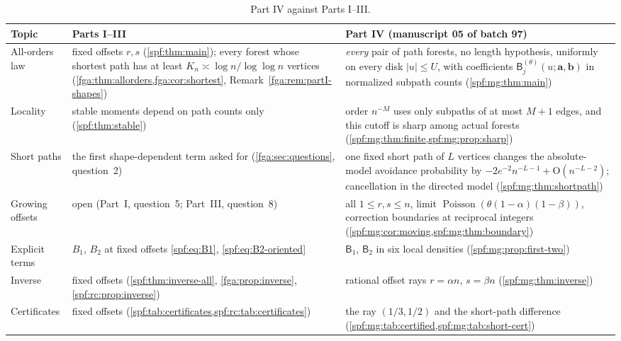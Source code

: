 \documentclass[11pt]{article}
\numberwithin{equation}{section}
\theoremstyle{definition}
\theoremstyle{remark}
\theoremstyle{definition}
\newcommand{\bigO}{\mathrm O}
\newcommand{\mga}{\boldsymbol a}
\newcommand{\mgb}{\boldsymbol b}
\begin{document}
\begin{table}[htbp]
\centering\small
\renewcommand{\arraystretch}{1.15}
\begin{tabular}{@{}>{\raggedright\arraybackslash}p{}>{\raggedright\arraybackslash}p{}>{\raggedright\arraybackslash}p{}@{}}
\toprule
Topic & Parts I--III & Part IV (manuscript 05 of batch 97)\\
\midrule
All-orders law &
fixed offsets $r,s$ (\cref{spf:thm:main}); every forest whose shortest path
has at least $K_n\asymp\log n/\log\log n$ vertices
(\cref{fga:thm:allorders,fga:cor:shortest}, Remark~\ref{fga:rem:partI-shapes}) &
\emph{every} pair of path forests, no length hypothesis, uniformly on every
disk $|u|\le U$, with coefficients $\mathsf B_j^{(\theta)}(u;\mga,\mgb)$ in
normalized subpath counts (\cref{spf:mg:thm:main})\\
Locality &
stable moments depend on path counts only (\cref{spf:thm:stable}) &
order $n^{-M}$ uses only subpaths of at most $M+1$ edges, and this cutoff is
sharp among actual forests (\cref{spf:mg:thm:finite,spf:mg:prop:sharp})\\
Short paths &
the first shape-dependent term asked for (\cref{fga:sec:questions},
question~2) &
one fixed short path of $L$ vertices changes the absolute-model avoidance
probability by $-2e^{-2}n^{-L-1}+\bigO(n^{-L-2})$; cancellation in the directed
model (\cref{spf:mg:thm:shortpath})\\
Growing offsets &
open (Part~I, question~5; Part~III, question~8) &
all $1\le r,s\le n$, limit $\operatorname{Poisson}(\theta(1-\alpha)(1-\beta))$,
correction boundaries at reciprocal integers
(\cref{spf:mg:cor:moving,spf:mg:thm:boundary})\\
Explicit terms &
$B_1$, $B_2$ at fixed offsets \eqref{spf:eq:B1}, \eqref{spf:eq:B2-oriented} &
$\mathsf B_1$, $\mathsf B_2$ in six local densities (\cref{spf:mg:prop:first-two})\\
Inverse &
fixed offsets (\cref{spf:thm:inverse-all}, \cref{fga:prop:inverse},
\cref{spf:rc:prop:inverse}) &
rational offset rays $r=\alpha n$, $s=\beta n$ (\cref{spf:mg:thm:inverse})\\
Certificates &
fixed offsets (\cref{spf:tab:certificates,spf:rc:tab:certificates}) &
the ray $(1/3,1/2)$ and the short-path difference
(\cref{spf:mg:tab:certified,spf:mg:tab:short-cert})\\
\bottomrule
\end{tabular}
\caption{Part IV against Parts I--III.}
\label{spf:mg:tab:claims}
\end{table}
\end{document}
